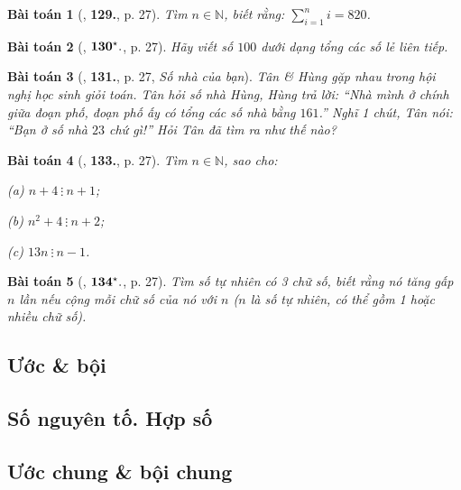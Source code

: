 \documentclass{article}
\numberwithin{equation}{section}
\newtheorem{baitoan}{Bài toán}[section]
\begin{document}
\begin{baitoan}[\cite{Binh_Toan_6_tap_1}, \textbf{129.}, p. 27]
	Tìm $n\in\mathbb{N}$, biết rằng: $\sum_{i=1}^n i = 820$.
\end{baitoan}

\begin{baitoan}[\cite{Binh_Toan_6_tap_1}, $\bf 130^\star.$, p. 27]
	Hãy viết số $100$ dưới dạng tổng các số lẻ liên tiếp.
\end{baitoan}

\begin{baitoan}[\cite{Binh_Toan_6_tap_1}, \textbf{131.}, p. 27, \textit{Số nhà của bạn}]
	Tân \& Hùng gặp nhau trong hội nghị học sinh giỏi toán. Tân hỏi số nhà Hùng, Hùng trả lời: ``Nhà mình ở chính giữa đoạn phố, đoạn phố ấy có tổng các số nhà bằng $161$.'' Nghĩ 1 chút, Tân nói: ``Bạn ở số nhà $23$ chứ gì!'' Hỏi Tân đã tìm ra như thế nào?
\end{baitoan}

\begin{baitoan}[\cite{Binh_Toan_6_tap_1}, \textbf{133.}, p. 27]
	Tìm $n\in\mathbb{N}$, sao cho:
	\begin{enumerate*}
		\item[(a)] $n + 4\ \vdots\ n + 1$;
		\item[(b)] $n^2 + 4\ \vdots\ n + 2$;
		\item[(c)] $13n\ \vdots\ n - 1$.
	\end{enumerate*}
\end{baitoan}

\begin{baitoan}[\cite{Binh_Toan_6_tap_1}, $\bf 134^\star.$, p. 27]
	Tìm số tự nhiên có 3 chữ số, biết rằng nó tăng gấp $n$ lần nếu cộng mỗi chữ số của nó với $n$ ($n$ là số tự nhiên, có thể gồm 1 hoặc nhiều chữ số).
\end{baitoan}

\subsection{Ước \& bội}

\subsection{Số nguyên tố. Hợp số}

\subsection{Ước chung \& bội chung}
\end{document}
